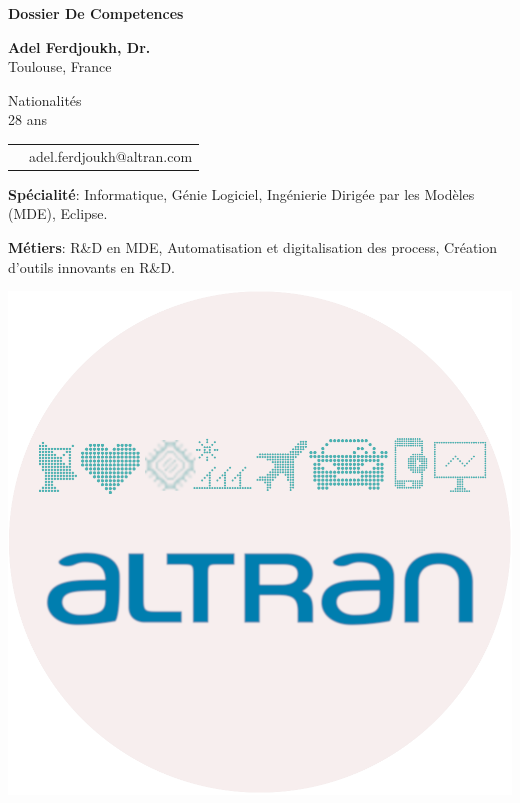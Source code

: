\thispagestyle{empty}

\renewcommand\refname{~}

\begin{center}
\par\textbf{\huge \sc Dossier De Competences}
\end{center}

\vspace{.5cm}

\begin{minipage}{0.45\textwidth}
\textbf{Adel Ferdjoukh, Dr.} \\ 
Toulouse, France

\vspace{.3cm}

Nationalités \fr{} \dz{} \kab{} \\
28 ans \\

\begin{tabular}{cl}
\email{} & adel.ferdjoukh@altran.com\\
\end{tabular}

\medskip
{\bf Spécialité}: Informatique, Génie Logiciel, Ingénierie Dirigée par les Modèles (MDE), Eclipse.

\medskip
{\bf Métiers}: R\&D en MDE, Automatisation et digitalisation des process, Création d’outils innovants en R\&D.


\end{minipage}
\hfill
\begin{minipage}{0.45\textwidth}
\begin{flushright}
\includegraphics[scale=0.8]{img/altran.png}~~~~~~~~
\end{flushright}
\end{minipage}


